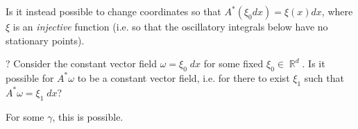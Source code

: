 \documentclass[dvipsnames,letterpaper,12pt]{article}
\DeclareMathOperator{\RR}{\mathbb{R}}
\begin{document}
Is it instead possible to change coordinates so that $A^*(\xi_0 dx) = \xi(x) dx$, where $\xi$ is an \emph{injective} function (i.e. so that the oscillatory integrals below have no stationary points).



%
%
%
%
%
%
%
%
%


? Consider the constant vector field $\omega = \xi_0\; dx$ for some fixed $\xi_0 \in \RR^d$. Is it possible for $A^* \omega$ to be a constant vector field, i.e. for there to exist $\xi_1$ such that $A^* \omega = \xi_1\; dx$?

For some $\gamma$, this is possible. 
\end{document}
